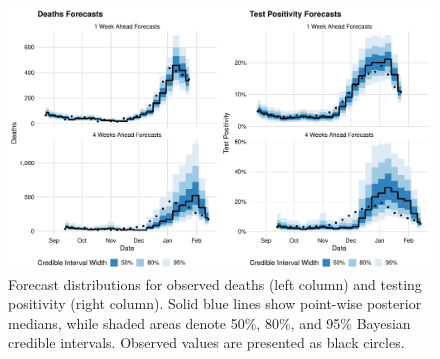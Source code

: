\begin{figure}[htbp]
    \centering
    \includegraphics[width=1.0\columnwidth]{combined_forecast_plot}
    \caption[Forecast distributions for observed deaths and testing positivity.]{Forecast distributions for observed deaths (left column) and testing positivity (right column).
    Solid blue lines show point-wise posterior medians, while shaded areas denote 50\%, 80\%, and 95\% Bayesian credible intervals.
    Observed values are presented as black circles.}
    \label{ch_4:fig:combined_forecast_plot}
\end{figure}

